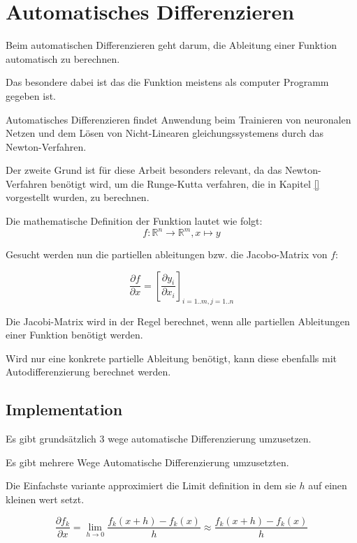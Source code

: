 
\section{Automatisches Differenzieren} \label{sec:auto_diffentiation}

Beim automatischen Differenzieren geht darum, die Ableitung einer Funktion automatisch zu berechnen.

Das besondere dabei ist das die Funktion meistens als computer Programm gegeben ist.

Automatisches Differenzieren findet Anwendung beim Trainieren von neuronalen Netzen und dem Lösen von Nicht-Linearen gleichungssystemens durch das Newton-Verfahren.

Der zweite Grund ist für diese Arbeit besonders relevant, da 
das Newton-Verfahren benötigt wird, um die Runge-Kutta verfahren, die in Kapitel \ref{} vorgestellt wurden, zu berechnen.

Die mathematische Definition der Funktion lautet wie folgt:
$$
f: \mathbb{R}^n \rightarrow \mathbb{R}^m, x \mapsto y
$$

Gesucht werden nun die partiellen ableitungen bzw. die Jacobo-Matrix von $f$:

$$
\frac{\partial f}{\partial x} = \left[ \frac{\partial y_i}{\partial x_i} \right]_{i=1..m, j=1..n} 
$$


Die Jacobi-Matrix wird in der Regel berechnet, wenn alle partiellen Ableitungen einer Funktion benötigt werden.

Wird nur eine konkrete partielle Ableitung benötigt, kann diese ebenfalls mit Autodifferenzierung berechnet werden.

\subsection{Implementation} \label{sec:implementation}

Es gibt grundsätzlich 3 wege automatische Differenzierung umzusetzen.

Es gibt mehrere Wege Automatische Differenzierung umzusetzten.

Die Einfachste variante approximiert die Limit definition in dem sie $h$ auf einen kleinen wert setzt.

$$
\frac{\partial f_k}{\partial x} = \lim_{h \to 0} \frac{f_k(x+ h) - f_k(x)}{h} \approx \frac{f_k(x + h) - f_k(x)}{h} 
$$


